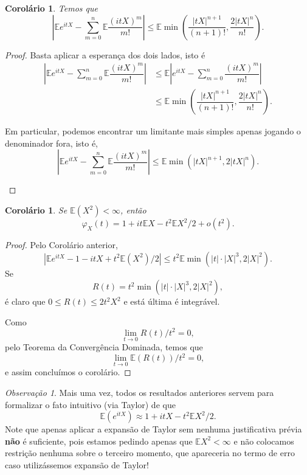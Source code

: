 \documentclass[12pt,a4paper,oneside]{book}
\newtheorem{corollary}[theorem]{Corol\'ario}
\theoremstyle{definition}
\theoremstyle{remark}
\newtheorem{remark}[theorem]{Observa\c{c}\~ao}
\numberwithin{equation}{section}
\newcommand{\E}{\mathbb{E}}
\begin{document}
\begin{corollary}\label{cor-estimativa-fc}
Temos que 
$$\left| \E e^{itX}  - \sum^n_{m=0}\E \dfrac{(itX)^m}{m!}   \right| \leq
 \E\min \left( \dfrac{|tX|^{n+1}}{(n+1)!}  , \dfrac{2|tX|^n}{n!}  \right). $$
\end{corollary}
\begin{proof}
Basta aplicar a esperança dos dois lados, isto é
\begin{align*}
\left| \E e^{itX}  - \sum^n_{m=0}\E \dfrac{(itX)^m}{m!}   \right| &\leq \E\left|  e^{itX}  - \sum^n_{m=0}\dfrac{(itX)^m}{m!}   \right|\\
&\leq \E\min \left( \dfrac{|tX|^{n+1}}{(n+1)!}  , \dfrac{2|tX|^n}{n!}  \right).
\end{align*}

\begin{tcolorbox}[colback = yellow!60]
Em particular, podemos encontrar um limitante mais simples apenas jogando o denominador fora, isto é, 
$$\left| \E e^{itX}  - \sum^n_{m=0}\E \dfrac{(itX)^m}{m!}   \right|\leq \E\min \left( |tX|^{n+1} , 2|tX|^n \right). $$
\end{tcolorbox}

\end{proof}


\begin{corollary}\label{cor - func-carc-erro de segunda ordem}
Se $\E(X^2)<\infty$, então
$$ \varphi_X(t) = 1  + it\E X - t^2\E X^2 / 2 + o(t^2).  $$
\end{corollary}

\begin{proof}
Pelo Corolário anterior, 
$$\left| \E e^{itX}  - 1 - itX + t^2\E(X^2)/2   \right|\leq  t^2\E\min \left( |t|\cdot|X|^{3} , 2|X|^2 \right). $$
Se $$R(t) = t^2\min \left( |t|\cdot|X|^{3} , 2|X|^2 \right),$$
é claro  que $0\leq R(t)\leq 2t^2 X^2$ e está última é integrável. 

Como 
$$\lim_{t\rightarrow 0}R(t)/t^2  =0,$$
pelo Teorema da Convergência Dominada, temos que 
$$\lim_{t\rightarrow 0}\E(R(t))/t^2 = 0, $$
e assim concluímos o corolário.
\end{proof}

\begin{tcolorbox}[colback = yellow!60]
\begin{remark}
Mais uma vez, todos os resultados anteriores servem para formalizar o fato intuitivo (via Taylor) de que
$$\E(e^{itX}) \approx 1 + itX -t^2\E X^2/2.  $$
Note que apenas aplicar a expansão de Taylor sem nenhuma justificativa prévia \textbf{não} é suficiente, pois estamos pedindo apenas que $\E X^2<\infty$ e não colocamos restrição nenhuma sobre o terceiro momento, que apareceria no termo de erro caso utilizássemos expansão de Taylor!
\end{remark}
\end{tcolorbox}
\end{document}

